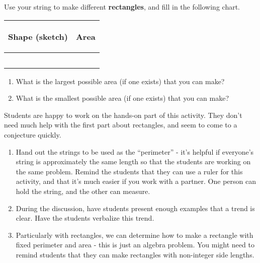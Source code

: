 \documentclass{ximera}
\begin{document}
\begin{problem} Use your string to make different {\bf rectangles}, and fill in the following chart.
\vskip 0.1in
\begin{tabular}{|p{2.2in}|p{2.2in}|}
\hline
\begin{center} Shape (sketch) \end{center} & \begin{center} Area \end{center}  \\ \hline
 & \\ [10ex] \hline
 & \\ [10 ex] \hline
 & \\ [10 ex] \hline
 & \\ [10 ex] \hline
 & \\ [10 ex] \hline
\end{tabular}
\begin{enumerate}

\item What is the largest possible area (if one exists) that you can make?
\item What is the smallest possible area (if one exists) that you can make?
\end{enumerate}


\begin{instructorNotes}
Students are happy to work on the hands-on part of this activity.  They don't need much help with the first part about rectangles, and seem to come to a conjecture quickly.
\begin{enumerate}
\item Hand out the strings to be used as the ``perimeter'' - it's helpful if everyone's string is approximately the same length so that the students are working on the same problem.  Remind the students that they can use a ruler for this activity, and that it's much easier if you work with a partner.  One person can hold the string, and the other can measure.
	\item During the discussion, have students present enough examples that a trend is clear.  Have the students verbalize this trend.
	\item Particularly with rectangles, we can determine how to make a rectangle with fixed perimeter and area - this is just an algebra problem.  You might need to remind students that they can make rectangles with non-integer side lengths.

\end{enumerate}
\end{instructorNotes}
\end{problem}
\end{document}
